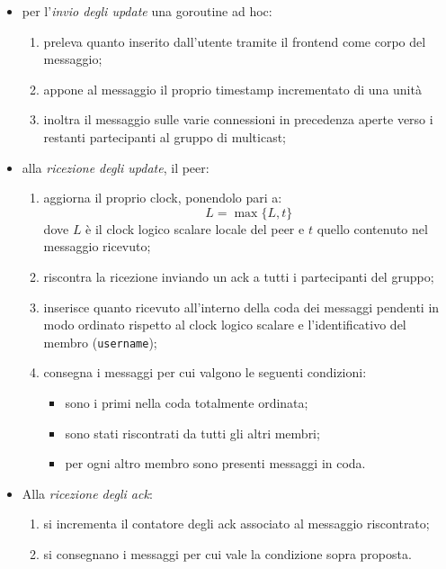 \documentclass[conference]{IEEEtran}
\begin{document}
\begin{itemize}
\item per l'\textsl{invio degli update} una goroutine ad hoc:
\begin{enumerate}
\item preleva quanto inserito dall'utente tramite il frontend come corpo del messaggio;
\item appone al messaggio il proprio timestamp incrementato di una unità
\item inoltra il messaggio sulle varie connessioni in precedenza aperte verso i restanti partecipanti al gruppo di multicast;
\end{enumerate}


\item alla \textsl{ricezione degli update}, il peer:
\begin{enumerate}
\item aggiorna il proprio clock, ponendolo pari a:
\begin{equation}
L = \max\lbrace L, t \rbrace
\end{equation}
dove $L$ è il clock logico scalare locale del peer e $t$ quello contenuto nel messaggio ricevuto;
\item riscontra la ricezione inviando un ack a tutti i partecipanti del gruppo;
\item inserisce quanto ricevuto all'interno della coda dei messaggi pendenti in modo ordinato rispetto al clock logico scalare e l'identificativo del membro (\texttt{username});
\item consegna i messaggi per cui valgono le seguenti condizioni:
\begin{itemize}
\item sono i primi nella coda totalmente ordinata;
\item sono stati riscontrati da tutti gli altri membri;
\item per ogni altro membro sono presenti messaggi in coda.
\end{itemize}
\end{enumerate}

\item Alla \textsl{ricezione degli ack}:
\begin{enumerate}
\item si incrementa il contatore degli ack associato al messaggio riscontrato;
\item si consegnano i messaggi per cui vale la condizione sopra proposta.
\end{enumerate}
\end{itemize}
\end{document}
